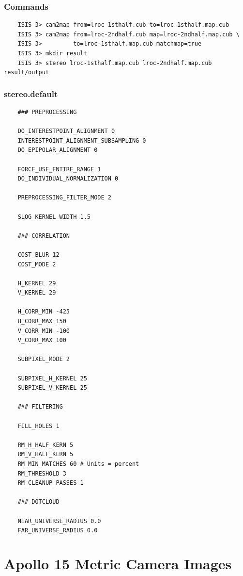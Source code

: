\subsubsection*{Commands}

\begin{verbatim}
    ISIS 3> cam2map from=lroc-1sthalf.cub to=lroc-1sthalf.map.cub
    ISIS 3> cam2map from=lroc-2ndhalf.cub map=lroc-2ndhalf.map.cub \
    ISIS 3>         to=lroc-1sthalf.map.cub matchmap=true
    ISIS 3> mkdir result
    ISIS 3> stereo lroc-1sthalf.map.cub lroc-2ndhalf.map.cub result/output
\end{verbatim}

\subsubsection*{stereo.default}

\begin{verbatim}
    ### PREPROCESSING

    DO_INTERESTPOINT_ALIGNMENT 0
    INTERESTPOINT_ALIGNMENT_SUBSAMPLING 0
    DO_EPIPOLAR_ALIGNMENT 0

    FORCE_USE_ENTIRE_RANGE 1
    DO_INDIVIDUAL_NORMALIZATION 0

    PREPROCESSING_FILTER_MODE 2

    SLOG_KERNEL_WIDTH 1.5

    ### CORRELATION

    COST_BLUR 12
    COST_MODE 2

    H_KERNEL 29
    V_KERNEL 29

    H_CORR_MIN -425
    H_CORR_MAX 150
    V_CORR_MIN -100
    V_CORR_MAX 100

    SUBPIXEL_MODE 2

    SUBPIXEL_H_KERNEL 25
    SUBPIXEL_V_KERNEL 25

    ### FILTERING

    FILL_HOLES 1

    RM_H_HALF_KERN 5
    RM_V_HALF_KERN 5
    RM_MIN_MATCHES 60 # Units = percent
    RM_THRESHOLD 3
    RM_CLEANUP_PASSES 1

    ### DOTCLOUD

    NEAR_UNIVERSE_RADIUS 0.0
    FAR_UNIVERSE_RADIUS 0.0
\end{verbatim}


\section{Apollo 15 Metric Camera Images}


